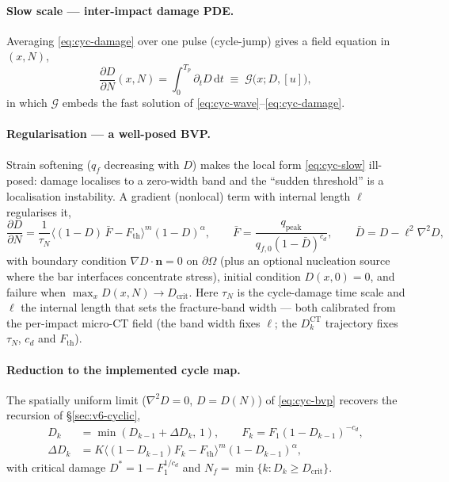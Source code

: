 \documentclass[11pt,a4paper,openany]{book}
\theoremstyle{handbook}
\begin{document}
\paragraph{Slow scale --- inter-impact damage PDE.}
Averaging \eqref{eq:cyc-damage} over one pulse (cycle-jump) gives a field equation
in $(x,N)$,
%
\begin{equation}
\frac{\partial D}{\partial N}(x,N)=\int_0^{T_p}\partial_t D\,\mathrm{d}t
\;\equiv\;\mathcal{G}\big(x;D,[u]\big),
\label{eq:cyc-slow}
\end{equation}
%
in which $\mathcal{G}$ embeds the fast solution of
\eqref{eq:cyc-wave}--\eqref{eq:cyc-damage}.

\paragraph{Regularisation --- a well-posed BVP.}
Strain softening ($q_f$ decreasing with $D$) makes the local form
\eqref{eq:cyc-slow} ill-posed: damage localises to a zero-width band and the
``sudden threshold'' is a localisation instability. A gradient (nonlocal) term
with internal length $\ell$ regularises it,
%
\begin{equation}
\frac{\partial D}{\partial N}
=\frac{1}{\tau_N}\big\langle(1-D)\,\bar F-F_{\mathrm{th}}\big\rangle^{m}(1-D)^{\alpha},
\qquad \bar F=\frac{q_{\mathrm{peak}}}{q_{f,0}(1-\bar D)^{c_d}},
\qquad \bar D=D-\ell^2\nabla^2 D,
\label{eq:cyc-bvp}
\end{equation}
%
with boundary condition $\nabla D\cdot\mathbf{n}=0$ on $\partial\Omega$ (plus an
optional nucleation source where the bar interfaces concentrate stress), initial
condition $D(x,0)=0$, and failure when $\max_x D(x,N)\to D_{\mathrm{crit}}$. Here
$\tau_N$ is the cycle-damage time scale and $\ell$ the internal length that sets
the fracture-band width --- both calibrated from the per-impact micro-CT field
(the band width fixes $\ell$; the $D_k^{\mathrm{CT}}$ trajectory fixes
$\tau_N$, $c_d$ and $F_{\mathrm{th}}$).

\paragraph{Reduction to the implemented cycle map.}
The spatially uniform limit ($\nabla^2D=0$, $D=D(N)$) of \eqref{eq:cyc-bvp}
recovers the recursion of \S\ref{sec:v6-cyclic},
%
\begin{equation}
\begin{aligned}
D_k&=\min(D_{k-1}+\Delta D_k,\,1),\qquad F_k=F_1(1-D_{k-1})^{-c_d},\\
\Delta D_k&=K\big\langle(1-D_{k-1})F_k-F_{\mathrm{th}}\big\rangle^{m}(1-D_{k-1})^{\alpha},
\end{aligned}
\label{eq:cyc-map}
\end{equation}
%
with critical damage $D^\ast=1-F_1^{1/c_d}$ and
$N_f=\min\{k:D_k\ge D_{\mathrm{crit}}\}$.
\end{document}
